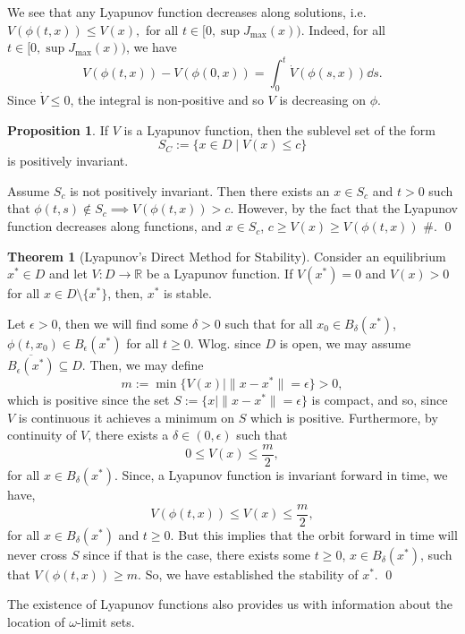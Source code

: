\documentclass[
]{article}
\theoremstyle{definition}
\newtheorem{theorem}{Theorem}
\newtheorem{prop}{Proposition}
\theoremstyle{definition}
\begin{document}
We see that any Lyapunov function decreases along solutions,
i.e.~\(V(\phi(t, x)) \le V(x),\) for all
\(t \in [0, \sup J_{\max}(x))\). Indeed, for all
\(t \in [0, \sup J_{\max}(x))\), we have
\[V(\phi(t, x)) - V(\phi(0, x)) = \int_0^t \dot V(\phi(s, x)) \dd s.\]
Since \(\dot V \le 0\), the integral is non-positive and so \(V\) is
decreasing on \(\phi\).

\begin{prop}
  If \(V\) is a Lyapunov function, then the sublevel set of the form 
  \[S_C := \{x \in D \mid V(x) \le c\}\]
  is positively invariant.
\end{prop}
\proof

Assume \(S_c\) is not positively invariant. Then there exists an
\(x \in S_c\) and \(t > 0\) such that
\(\phi(t, s) \not\in S_c \implies V(\phi(t, x)) > c\). However, by the
fact that the Lyapunov function decreases along functions, and
\(x \in S_c\), \(c \ge V(x) \ge V(\phi(t, x))\) \#. \qed

\begin{theorem}[Lyapunov's Direct Method for Stability]
  Consider an equilibrium \(x^* \in D\) and let \(V : D \to \mathbb{R}\) be a 
  Lyapunov function. If \(V(x^*) = 0\) and \(V(x) > 0\) for all \(x \in D \setminus \{x^*\}\), 
  then, \(x^*\) is stable.
\end{theorem}
\proof

Let \(\epsilon > 0\), then we will find some \(\delta > 0\) such that
for all \(x_0 \in B_\delta(x^*)\), \(\phi(t, x_0) \in B_\epsilon(x^*)\)
for all \(t \ge 0\). Wlog. since \(D\) is open, we may assume
\(\overline{B_\epsilon(x^*)} \subseteq D\). Then, we may define
\[m := \min \{V(x) \mid \|x - x^*\| = \epsilon\} > 0,\] which is
positive since the set \(S := \{x \mid \|x - x^*\| = \epsilon\}\) is
compact, and so, since \(V\) is continuous it achieves a minimum on
\(S\) which is positive. Furthermore, by continuity of \(V\), there
exists a \(\delta \in (0, \epsilon)\) such that
\[0 \le V(x) \le \frac{m}{2},\] for all \(x \in B_\delta(x^*)\). Since,
a Lyapunov function is invariant forward in time, we have,
\[V(\phi(t, x)) \le V(x) \le \frac{m}{2},\] for all
\(x \in B_\delta(x^*)\) and \(t \ge 0\). But this implies that the orbit
forward in time will never cross \(S\) since if that is the case, there
exists some \(t \ge 0\), \(x \in B_\delta(x^*)\), such that
\(V(\phi(t, x)) \ge m\). So, we have established the stability of
\(x^*\). \qed

The existence of Lyapunov functions also provides us with information
about the location of \(\omega\)-limit sets.
\end{document}
